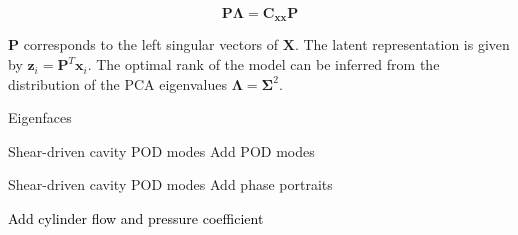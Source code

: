 \documentclass[aspectratio=169, usenames, dvipsnames]{beamer}
\begin{document}
\begin{frame}
  \vfill

  \begin{tcolorbox}[
    enhanced,
    coltitle=black,
    coltext=white,
    colback=black,
    title=\textbf{Proper Orthogonal Decomposition},
    frame style tile={width=\paperwidth}{background.jpg}
    ]

    \medskip

    \large

    \[
    \bm{P} \boldsymbol{\Lambda} = \bm{C}_{\bm{xx}} \bm{P}
    \]

    \medskip
  \end{tcolorbox}

  \vfill

  $\bm{P}$ corresponds to the left singular vectors of $\bm{X}$.
  The latent representation is given by $\bm{z}_i = \bm{P}^T \bm{x}_i$.
  The optimal rank of the model can be inferred from the distribution of the PCA eigenvalues $\boldsymbol{\Lambda} = \boldsymbol{\Sigma}^2$.

  \vfill
\end{frame}

\begin{frame}{Eigenfaces}

\end{frame}

\begin{frame}{Shear-driven cavity POD modes}
  Add POD modes
\end{frame}

\begin{frame}{Shear-driven cavity POD modes}
  Add phase portraits
\end{frame}

{

\begin{frame}
  \textcolor{black}{Add cylinder flow and pressure coefficient}
\end{frame}

}
\end{document}
